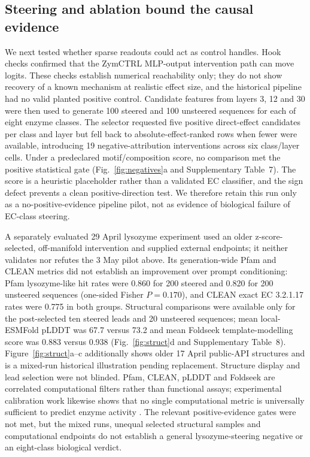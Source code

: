 \documentclass[pdflatex,sn-nature]{sn-jnl}
\begin{document}
\subsection{Steering and ablation bound the causal evidence}

We next tested whether sparse readouts could act as control handles. Hook checks confirmed that the ZymCTRL MLP-output intervention path can move logits. These checks establish numerical reachability only; they do not show recovery of a known mechanism at realistic effect size, and the historical pipeline had no valid planted positive control. Candidate features from layers 3, 12 and 30 were then used to generate 100 steered and 100 unsteered sequences for each of eight enzyme classes. The selector requested five positive direct-effect candidates per class and layer but fell back to absolute-effect-ranked rows when fewer were available, introducing 19 negative-attribution interventions across six class/layer cells. Under a predeclared motif/composition score, no comparison met the positive statistical gate (Fig.~\ref{fig:negatives}a and Supplementary Table~7). The score is a heuristic placeholder rather than a validated EC classifier, and the sign defect prevents a clean positive-direction test. We therefore retain this run only as a no-positive-evidence pipeline pilot, not as evidence of biological failure of EC-class steering.

A separately evaluated 29 April lysozyme experiment used an older z-score-selected, off-manifold intervention and supplied external endpoints; it neither validates nor refutes the 3 May pilot above. Its generation-wide Pfam and CLEAN metrics did not establish an improvement over prompt conditioning: Pfam lysozyme-like hit rates were 0.860 for 200 steered and 0.820 for 200 unsteered sequences (one-sided Fisher $P=0.170$), and CLEAN exact EC 3.2.1.17 rates were 0.775 in both groups. Structural comparisons were available only for the post-selected ten steered leads and 20 unsteered sequences; mean local-ESMFold pLDDT was 67.7 versus 73.2 and mean Foldseek template-modelling score was 0.883 versus 0.938 (Fig.~\ref{fig:struct}d and Supplementary Table~8). Figure~\ref{fig:struct}a--c additionally shows older 17 April public-API structures and is a mixed-run historical illustration pending replacement. Structure display and lead selection were not blinded. Pfam, CLEAN, pLDDT and Foldseek are correlated computational filters rather than functional assays; experimental calibration work likewise shows that no single computational metric is universally sufficient to predict enzyme activity \cite{johnson2025computational}. The relevant positive-evidence gates were not met, but the mixed runs, unequal selected structural samples and computational endpoints do not establish a general lysozyme-steering negative or an eight-class biological verdict.
\end{document}
